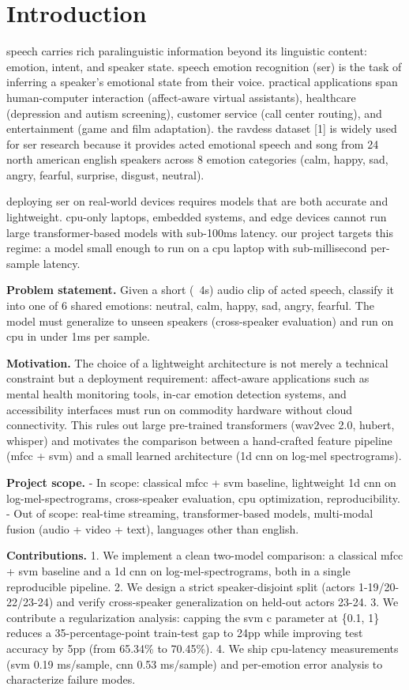 \documentclass[conference]{IEEEtran}
\begin{document}
\section{Introduction}\label{introduction}

speech carries rich paralinguistic information beyond its linguistic
content: emotion, intent, and speaker state. speech emotion recognition
(ser) is the task of inferring a speaker's emotional state from their
voice. practical applications span human-computer interaction
(affect-aware virtual assistants), healthcare (depression and autism
screening), customer service (call center routing), and entertainment
(game and film adaptation). the ravdess dataset {[}1{]} is widely used
for ser research because it provides acted emotional speech and song
from 24 north american english speakers across 8 emotion categories
(calm, happy, sad, angry, fearful, surprise, disgust, neutral).

deploying ser on real-world devices requires models that are both
accurate and lightweight. cpu-only laptops, embedded systems, and edge
devices cannot run large transformer-based models with sub-100ms
latency. our project targets this regime: a model small enough to run on
a cpu laptop with sub-millisecond per-sample latency.

\textbf{Problem statement.} Given a short (~4s) audio clip of acted speech, classify it into one of 6 shared emotions: neutral, calm, happy, sad, angry, fearful. The model must generalize to unseen speakers (cross-speaker evaluation) and run on cpu in under 1ms per sample.

\textbf{Motivation.} The choice of a lightweight architecture is not
merely a technical constraint but a deployment requirement:
affect-aware applications such as mental health monitoring tools,
in-car emotion detection systems, and accessibility interfaces must
run on commodity hardware without cloud connectivity. This rules out
large pre-trained transformers (wav2vec 2.0, hubert, whisper) and
motivates the comparison between a hand-crafted feature pipeline
(mfcc + svm) and a small learned architecture (1d cnn on log-mel
spectrograms).

\textbf{Project scope.} - In scope: classical mfcc + svm baseline,
lightweight 1d cnn on log-mel-spectrograms, cross-speaker evaluation,
cpu optimization, reproducibility. - Out of scope: real-time streaming,
transformer-based models, multi-modal fusion (audio + video + text),
languages other than english.

\textbf{Contributions.} 1. We implement a clean two-model comparison: a
classical mfcc + svm baseline and a 1d cnn on log-mel-spectrograms, both
in a single reproducible pipeline. 2. We design a strict
speaker-disjoint split (actors 1-19/20-22/23-24) and verify
cross-speaker generalization on held-out actors 23-24. 3. We contribute
a regularization analysis: capping the svm c parameter at \{0.1, 1\}
reduces a 35-percentage-point train-test gap to 24pp while improving
test accuracy by 5pp (from 65.34\% to 70.45\%). 4. We ship cpu-latency
measurements (svm 0.19 ms/sample, cnn 0.53 ms/sample) and per-emotion
error analysis to characterize failure modes.
\end{document}
